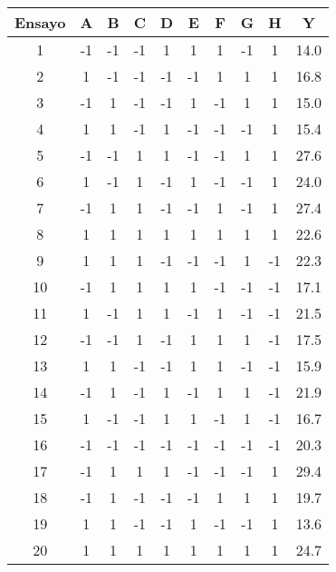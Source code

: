 \begin{center}
	\begin{tabular}{ccccccccc|c}
		Ensayo & A & B & C & D & E & F & G & H & Y \\
		\hline
		1 & -1 & -1 & -1 & 1 & 1 & 1 & -1 & 1 & 14.0 \\
		
		2 & 1 & -1 & -1 & -1 & -1 & 1 & 1 & 1 & 16.8 \\
		
		3 & -1 & 1 & -1 & -1 & 1 & -1 & 1 & 1 & 15.0 \\
		
		4 & 1 & 1 & -1 & 1 & -1 & -1 & -1 & 1 & 15.4 \\
		
		5 & -1 & -1 & 1 & 1 & -1 & -1 & 1 & 1 & 27.6 \\
		
		6 & 1 & -1 & 1 & -1 & 1 & -1 & -1 & 1 & 24.0 \\
		
		7 & -1 & 1 & 1 & -1 & -1 & 1 & -1 & 1 & 27.4 \\
		
		8 & 1 & 1 & 1 & 1 & 1 & 1 & 1 & 1 & 22.6 \\
		
		9 & 1 & 1 & 1 & -1 & -1 & -1 & 1 & -1 & 22.3 \\
		
		10 & -1 & 1 & 1 & 1 & 1 & -1 & -1 & -1 & 17.1 \\
		
		11 & 1 & -1 & 1 & 1 & -1 & 1 & -1 & -1 & 21.5 \\
		
		12 & -1 & -1 & 1 & -1 & 1 & 1 & 1 & -1 & 17.5 \\
		
		13 & 1 & 1 & -1 & -1 & 1 & 1 & -1 & -1 & 15.9 \\
		
		14 & -1 & 1 & -1 & 1 & -1 & 1 & 1 & -1 & 21.9 \\
		
		15 & 1 & -1 & -1 & 1 & 1 & -1 & 1 & -1 & 16.7 \\
		
		16 & -1 & -1 & -1 & -1 & -1 & -1 & -1 & -1 & 20.3 \\
		
		17 & -1 & 1 & 1 & 1 & -1 & -1 & -1 & 1 & 29.4 \\
		
		18 & -1 & 1 & -1 & -1 & -1 & 1 & 1 & 1 & 19.7 \\
		
		19 & 1 & 1 & -1 & -1 & 1 & -1 & -1 & 1 & 13.6 \\
		
		20 & 1 & 1 & 1 & 1 & 1 & 1 & 1 & 1 & 24.7 \\
		
	\end{tabular}
	 \label{data_table1}
\end{center}


